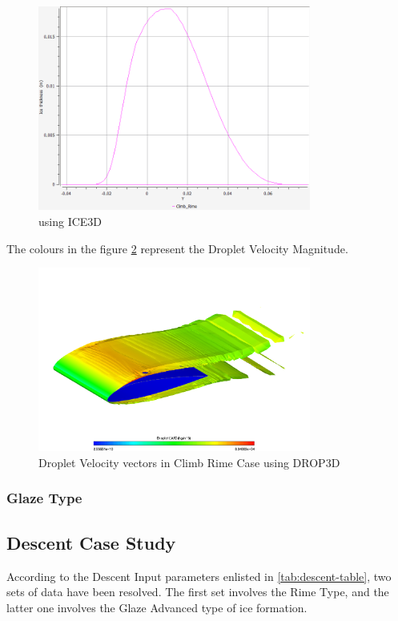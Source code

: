 \documentclass[english]{kththesis}
\begin{document}
\cleardoublepage
\begin{figure}[!htb]
    \centering
    \includegraphics[width=0.8\textwidth]{IPS/Ice_Thickness_Climb_Rime_2D.png}
    \caption{using ICE3D}
    \label{fig:Ice_Thickness_Climb_Rime_2D}
\end{figure}
The colours in the figure \ref{fig:Droplet_Velocity_Magnitude_LWC_DROP3D_Climb_Rime_3D} represent the Droplet Velocity Magnitude.
\begin{figure}[!htb]
    \centering
    \includegraphics[width=0.8\textwidth]{IPS/Droplet_Velocity_Magnitude_LWC_DROP3D_Climb_Rime_3D.png}
    \caption{Droplet Velocity vectors in Climb Rime Case using DROP3D}
    \label{fig:Droplet_Velocity_Magnitude_LWC_DROP3D_Climb_Rime_3D}
\end{figure}

\clearpage
\subsubsection{Glaze Type}
\subsection{Descent Case Study}
According to the Descent Input parameters enlisted in \ref{tab:descent-table}, two sets of data have been resolved. The first set involves the Rime Type, and the latter one involves the Glaze Advanced type of ice formation.
\end{document}

